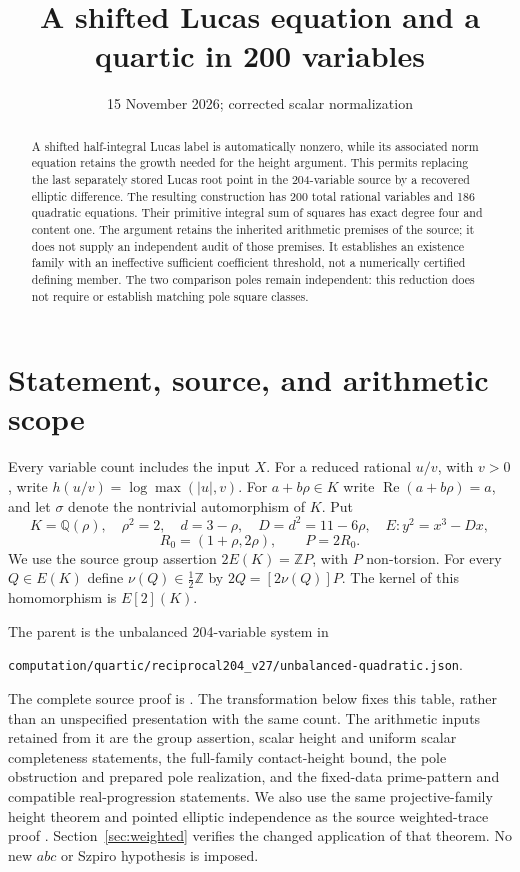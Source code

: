 \documentclass[11pt,a4paper]{article}
\title{A shifted Lucas equation and a quartic in 200 variables}
\author{}\date{15 November 2026; corrected scalar normalization}
\newcommand{\Q}{\mathbb Q}\newcommand{\Z}{\mathbb Z}\DeclareMathOperator{\Tr}{Tr}
\begin{document}
\maketitle
\begin{abstract}
A shifted half-integral Lucas label is automatically nonzero, while its
associated norm equation retains the growth needed for the height argument.
This permits replacing the last separately stored Lucas root point in the
204-variable source by a recovered elliptic difference. The resulting
construction has 200 total rational variables and 186 quadratic equations.
Their primitive integral sum of squares has exact degree four and content
one. The argument retains the inherited arithmetic premises of the source;
it does not supply an independent audit of those premises. It establishes
an existence family with an ineffective sufficient coefficient threshold,
not a numerically certified defining member. The two comparison poles remain
independent: this reduction does not require or establish matching pole
square classes.
\end{abstract}

\section{Statement, source, and arithmetic scope}
Every variable count includes the input $X$. For a reduced rational $u/v$, with $v>0$, write $h(u/v)=\log\max(|u|,v)$. For $a+b\rho\in K$ write $\operatorname{Re}(a+b\rho)=a$, and let $\sigma$ denote the nontrivial automorphism of $K$. Put
\[
 K=\Q(\rho),\quad \rho^2=2,\quad d=3-\rho,\quad D=d^2=11-6\rho,
 \quad E:y^2=x^3-Dx,
\]
\[
 R_0=(1+\rho,2\rho),\qquad P=2R_0.
\]
We use the source group assertion $2E(K)=\Z P$, with $P$ non-torsion.
For every $Q\in E(K)$ define $\nu(Q)\in\tfrac12\Z$ by
$2Q=[2\nu(Q)]P$. The kernel of this homomorphism is $E[2](K)$.

The parent is the unbalanced 204-variable system in
\begin{center}\small\nolinkurl{computation/quartic/reciprocal204_v27/unbalanced-quadratic.json}.
\end{center}
The complete source proof is \cite{Parent}. The transformation below fixes
this table, rather than an unspecified presentation with the same count.
The arithmetic inputs retained from it are the group assertion, scalar
height and uniform scalar completeness statements, the full-family
contact-height bound, the pole obstruction and prepared pole realization,
and the fixed-data prime-pattern and compatible real-progression statements.
We also use the same projective-family height theorem and pointed elliptic
independence as the source weighted-trace proof \cite{Weighted}.
Section~\ref{sec:weighted} verifies the changed application of that theorem.
No new $abc$ or Szpiro hypothesis is imposed.
\end{document}
